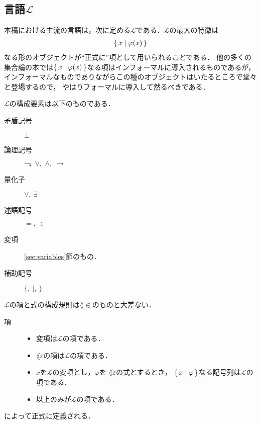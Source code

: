 \subsection{言語$\mathcal{L}$}
	本稿における主流の言語は，次に定める$\mathcal{L}$である．$\mathcal{L}$の最大の特徴は
	\begin{align}
		\{\, x \mid \varphi(x)\, \}
	\end{align}
	なる形のオブジェクトが``正式に''項として用いられることである．
	他の多くの集合論の本では$\{\, x \mid \varphi(x)\, \}$なる項はインフォーマルに導入されるものであるが，
	インフォーマルなものでありながらこの種のオブジェクトはいたるところで堂々と登場するので，
	やはりフォーマルに導入して然るべきである．
	
	$\mathcal{L}$の構成要素は以下のものである．
	
	\begin{description}
		\item[矛盾記号] $\bot$
		\item[論理記号] $\negation,\ \vee,\ \wedge,\ \rarrow$
		\item[量化子] $\forall,\ \exists$
		\item[述語記号] $=,\ \in$
		\item[変項] \ref{sec:variables}節のもの．
		\item[補助記号] $\{,\ |,\ \}$
	\end{description}
	
	$\mathcal{L}$の項と式の構成規則は$\lang{\in}$のものと大差ない．
	
	\begin{description}
		\item[項] 
			\begin{itemize}
				\item 変項は$\mathcal{L}$の項である．
				\item $\lang{\varepsilon}$の項は$\mathcal{L}$の項である．
				\item $x$を$\mathcal{L}$の変項とし，$\varphi$を
					$\lang{\varepsilon}$の式とするとき，
					$\{\, x \mid \varphi\, \}$なる記号列は$\mathcal{L}$の項である．
				\item 以上のみが$\mathcal{L}$の項である．
			\end{itemize}
	\end{description}
	
	によって正式に定義される．
	
